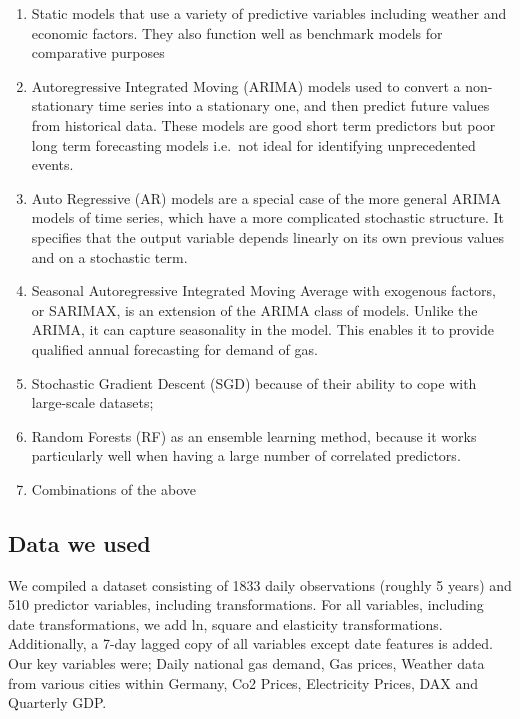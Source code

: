 \documentclass[
]{article}
\begin{document}
\begin{enumerate}
\def\labelenumi{\roman{enumi}.}
\item
  Static models that use a variety of predictive variables including
  weather and economic factors. They also function well as benchmark
  models for comparative purposes
\item
  Autoregressive Integrated Moving (ARIMA) models used to convert a
  non-stationary time series into a stationary one, and then predict
  future values from historical data. These models are good short term
  predictors but poor long term forecasting models i.e.~not ideal for
  identifying unprecedented events.
\item
  Auto Regressive (AR) models are a special case of the more general
  ARIMA models of time series, which have a more complicated stochastic
  structure. It specifies that the output variable depends linearly on
  its own previous values and on a stochastic term.
\item
  Seasonal Autoregressive Integrated Moving Average with exogenous
  factors, or SARIMAX, is an extension of the ARIMA class of models.
  Unlike the ARIMA, it can capture seasonality in the model. This
  enables it to provide qualified annual forecasting for demand of gas.
\item
  Stochastic Gradient Descent (SGD) because of their ability to cope
  with large-scale datasets;
\item
  Random Forests (RF) as an ensemble learning method, because it works
  particularly well when having a large number of correlated predictors.
\item
  Combinations of the above
\end{enumerate}

\hypertarget{data-we-used}{%
\subsection{Data we used}\label{data-we-used}}

We compiled a dataset consisting of 1833 daily observations (roughly 5
years) and 510 predictor variables, including transformations. For all
variables, including date transformations, we add ln, square and
elasticity transformations. Additionally, a 7-day lagged copy of all
variables except date features is added. Our key variables were; Daily
national gas demand, Gas prices, Weather data from various cities within
Germany, Co2 Prices, Electricity Prices, DAX and Quarterly GDP.
\end{document}
